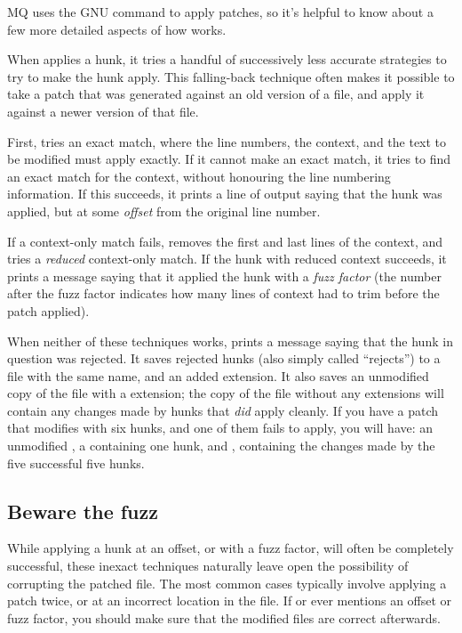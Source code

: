 MQ uses the GNU  command to apply patches, so it's
helpful to know about a few more detailed aspects of how
 works.

When  applies a hunk, it tries a handful of
successively less accurate strategies to try to make the hunk apply.
This falling-back technique often makes it possible to take a patch
that was generated against an old version of a file, and apply it
against a newer version of that file.

First,  tries an exact match, where the line numbers,
the context, and the text to be modified must apply exactly.  If it
cannot make an exact match, it tries to find an exact match for the
context, without honouring the line numbering information.  If this
succeeds, it prints a line of output saying that the hunk was applied,
but at some \emph{offset} from the original line number.

If a context-only match fails,  removes the first and
last lines of the context, and tries a \emph{reduced} context-only
match.  If the hunk with reduced context succeeds, it prints a message
saying that it applied the hunk with a \emph{fuzz factor} (the number
after the fuzz factor indicates how many lines of context
 had to trim before the patch applied).

When neither of these techniques works,  prints a
message saying that the hunk in question was rejected.  It saves
rejected hunks (also simply called ``rejects'') to a file with the
same name, and an added  extension.  It also saves an
unmodified copy of the file with a  extension; the
copy of the file without any extensions will contain any changes made
by hunks that \emph{did} apply cleanly.  If you have a patch that
modifies  with six hunks, and one of them fails to
apply, you will have: an unmodified , a
 containing one hunk, and , containing
the changes made by the five successful five hunks.

\subsection{Beware the fuzz}

While applying a hunk at an offset, or with a fuzz factor, will often
be completely successful, these inexact techniques naturally leave
open the possibility of corrupting the patched file.  The most common
cases typically involve applying a patch twice, or at an incorrect
location in the file.  If  or  ever
mentions an offset or fuzz factor, you should make sure that the
modified files are correct afterwards.  

